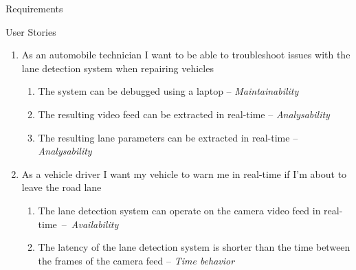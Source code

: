 \documentclass{matthijs}
\begin{document}
\begin{hoofdstuk}{Requirements}
\begin{figuur}{User Stories}
\begin{enumerate}[labelsep=2ex, font=\bfseries]
\begin{enumerate}[leftmargin=8ex]
					\end{enumerate}

				\item	As an automobile technician I want to be able to troubleshoot issues with the lane detection system when repairing vehicles

					\begin{enumerate}[leftmargin=8ex]

						\item	The system can be debugged using a laptop -- \textit{Maintainability}
						\item	The resulting video feed can be extracted in real-time -- \textit{Analysability}
						\item	The resulting lane parameters can be extracted in real-time -- \textit{Analysability}

					\end{enumerate}

				\item	As a vehicle driver I want my vehicle to warn me in real-time if I'm about to leave the road lane

					\begin{enumerate}[leftmargin=8ex]

						\item The lane detection system can operate on the camera video feed in \mbox{real-time -- \textit{Availability}}
						\item The latency of the lane detection system is shorter than the time between the frames of the camera feed -- \textit{Time behavior}

					\end{enumerate}

			\end{enumerate}

		\end{figuur}

	\end{hoofdstuk}
\end{document}
